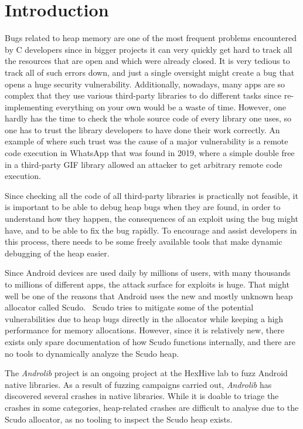 \documentclass[a4paper,11pt,oneside]{report}
\begin{document}
\chapter{Introduction}

Bugs related to heap memory are one of the most frequent problems encountered
by C developers since in bigger projects it can very quickly get hard to track
all the resources that are open and which were already closed. It is very tedious
to track all of such errors down, and just a single oversight might create a bug
that opens a huge security vulnerability. Additionally, nowadays, many apps are so
complex that they use various third-party libraries to do different tasks since
re-implementing everything on your own would be a waste of time. However, one
hardly has the time to check the whole source code of every library one uses, so
one has to trust the library developers to have done their work correctly. An
example of where such trust was the cause of a major vulnerability is a remote
code execution in WhatsApp that was found in 2019, where a simple double free
in a third-party GIF library allowed an attacker to get arbitrary remote code
execution.~\cite{whatsappRCE}

Since checking all the code of all third-party libraries is practically not
feasible, it is important to be able to debug heap bugs when they are found, in
order to understand how they happen, the consequences of an exploit using the
bug might have, and to be able to fix the bug rapidly. To encourage
and assist developers in this process, there needs to be some freely available
tools that make dynamic debugging of the heap easier.

Since Android devices are used daily by millions of users, with many thousands to
millions of different apps, the attack surface for exploits is huge. That might
well be one of the reasons that Android uses the new and mostly unknown heap
allocator called Scudo.~\cite{llvmScudo} Scudo tries to mitigate some of the potential
vulnerabilities due to heap bugs directly in the allocator while keeping a high
performance for memory allocations. However, since it is relatively new, there
exists only spare documentation of how Scudo functions internally, and there
are no tools to dynamically analyze the Scudo heap.

The \textit{Androlib} project is an ongoing 
project at the HexHive lab to fuzz Android native libraries.
As a result of fuzzing campaigns carried out, \textit{Androlib} has discovered
several crashes in native libraries.
While it is doable to triage the crashes in some categories, heap-related
crashes are difficult to analyse due to the Scudo allocator, as no tooling 
to inspect the Scudo heap exists.
\end{document}
